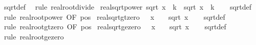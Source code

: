 \begin{isabellebody}
\ sqrt{\isacharunderscore}{\kern0pt}def\ \isamarkupfalse%
\ {\isacharparenleft}{\kern0pt}rule\ real{\isacharunderscore}{\kern0pt}root{\isacharunderscore}{\kern0pt}divide{\isacharparenright}{\kern0pt}%
\endisatagproof
{\isafoldproof}%
%
\isadelimproof
\isanewline
%
\endisadelimproof
\isanewline
{}\isamarkupfalse%
\ real{\isacharunderscore}{\kern0pt}sqrt{\isacharunderscore}{\kern0pt}power{\isacharcolon}{\kern0pt}\ {\isachardoublequoteopen}sqrt\ {\isacharparenleft}{\kern0pt}x\ {\isacharcircum}{\kern0pt}\ k{\isacharparenright}{\kern0pt}\ {\isacharequal}{\kern0pt}\ sqrt\ x\ {\isacharcircum}{\kern0pt}\ k{\isachardoublequoteclose}\isanewline
%
\isadelimproof
\ \ %
\endisadelimproof
%
\isatagproof
{}\isamarkupfalse%
\ sqrt{\isacharunderscore}{\kern0pt}def\ \isamarkupfalse%
\ {\isacharparenleft}{\kern0pt}rule\ real{\isacharunderscore}{\kern0pt}root{\isacharunderscore}{\kern0pt}power\ {\isacharbrackleft}{\kern0pt}OF\ pos{}{\isacharbrackright}{\kern0pt}{\isacharparenright}{\kern0pt}%
\endisatagproof
{\isafoldproof}%
%
\isadelimproof
\isanewline
%
\endisadelimproof
\isanewline
{}\isamarkupfalse%
\ real{\isacharunderscore}{\kern0pt}sqrt{\isacharunderscore}{\kern0pt}gt{\isacharunderscore}{\kern0pt}zero{\isacharcolon}{\kern0pt}\ {\isachardoublequoteopen}{}\ {\isacharless}{\kern0pt}\ x\ {\isasymLongrightarrow}\ {}\ {\isacharless}{\kern0pt}\ sqrt\ x{\isachardoublequoteclose}\isanewline
%
\isadelimproof
\ \ %
\endisadelimproof
%
\isatagproof
{}\isamarkupfalse%
\ sqrt{\isacharunderscore}{\kern0pt}def\ \isamarkupfalse%
\ {\isacharparenleft}{\kern0pt}rule\ real{\isacharunderscore}{\kern0pt}root{\isacharunderscore}{\kern0pt}gt{\isacharunderscore}{\kern0pt}zero\ {\isacharbrackleft}{\kern0pt}OF\ pos{}{\isacharbrackright}{\kern0pt}{\isacharparenright}{\kern0pt}%
\endisatagproof
{\isafoldproof}%
%
\isadelimproof
\isanewline
%
\endisadelimproof
\isanewline
{}\isamarkupfalse%
\ real{\isacharunderscore}{\kern0pt}sqrt{\isacharunderscore}{\kern0pt}ge{\isacharunderscore}{\kern0pt}zero{\isacharcolon}{\kern0pt}\ {\isachardoublequoteopen}{}\ {\isasymle}\ x\ {\isasymLongrightarrow}\ {}\ {\isasymle}\ sqrt\ x{\isachardoublequoteclose}\isanewline
%
\isadelimproof
\ \ %
\endisadelimproof
%
\isatagproof
{}\isamarkupfalse%
\ sqrt{\isacharunderscore}{\kern0pt}def\ \isamarkupfalse%
\ {\isacharparenleft}{\kern0pt}rule\ real{\isacharunderscore}{\kern0pt}root{\isacharunderscore}{\kern0pt}ge{\isacharunderscore}{\kern0pt}zero{\isacharparenright}{\kern0pt}%

\end{isabellebody}
